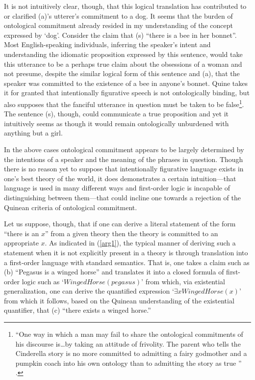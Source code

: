\documentclass[12pt,letterpaper]{article}
\begin{document}
\begin{doublespace}
It is not intuitively clear, though, that this logical translation has
contributed to or clarified (a)'s utterer's commitment to a dog. It
seems that the burden of ontological commitment already resided in my
understanding of the concept expressed by `dog'.  Consider the claim
that (s) ``there is a bee in her bonnet''. Most English-speaking
individuals, inferring the speaker's intent and understanding the
idiomatic proposition expressed by this sentence, would take this
utterance to be a perhaps true claim about the obsessions of a woman
and not presume, despite the similar logical form of this sentence and
(a), that the speaker was committed to the existence of a bee in
anyone's bonnet.  Quine takes it for granted that intentionally
figurative speech is not ontologically binding, but also supposes that
the fanciful utterance in question must be taken to be false\footnote{
  ``One way in which a man may fail to share the ontological
  commitments of his discourse is\ldots by taking an attitude of
  frivolity.  The parent who tells the Cinderella story is no more
  committed to admitting a fairy godmother and a pumpkin coach into
  his own ontology than to admitting the story as true ''
  \cite[p.103]{quine}.}. The sentence (s), though, could communicate a
true proposition and yet it intuitively seems as though it would
remain ontologically unburdened with anything but a girl.

In the above cases ontological commitment appears to be largely
determined by the intentions of a speaker and the meaning of the
phrases in question.  Though there is no reason yet to suppose that
intentionally figurative language exists in one's best theory of the
world, it does demonstrates a certain intuition---that language is used
in many different ways and first-order logic is incapable of
distinguishing between them---that could incline one towards a
rejection of the Quinean criteria of ontological commitment.

Let us suppose, though, that if one can derive a literal statement of
the form ``there is an $x$'' from a given theory then the theory is
committed to an appropriate $x$.  As indicated in (\ref{arg1}), the
typical manner of deriving such a statement when it is not explicitly
present in a theory is through translation into a first-order language
with standard semantics.  That is, one takes a claim such as (b)
``Pegasus is a winged horse'' and translates it into a closed formula
of first-order logic such as `$WingedHorse(pegasus)$' from which, via
existential generalization, one can derive the quantified expression
`$\exists xWingedHorse(x)$' from which it follows, based on the
Quinean understanding of the existential quantifier, that (c) ``there
exists a winged horse.''


\end{doublespace}
\end{document}
